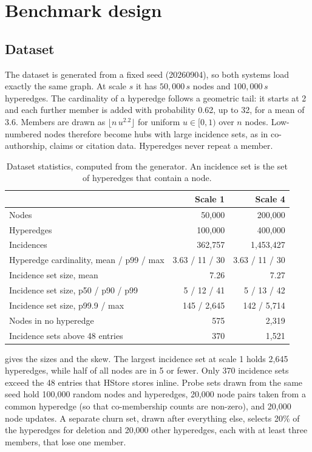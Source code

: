 \section{Benchmark design}
\label{sec:method}

\subsection{Dataset}

The dataset is generated from a fixed seed (20260904), so both systems load exactly the same graph. At scale $s$ it has $50{,}000\,s$ nodes and $100{,}000\,s$ hyperedges. The cardinality of a hyperedge follows a geometric tail: it starts at 2 and each further member is added with probability 0.62, up to 32, for a mean of 3.6. Members are drawn as $\lfloor n\,u^{2.2}\rfloor$ for uniform $u\in[0,1)$ over $n$ nodes. Low-numbered nodes therefore become hubs with large incidence sets, as in co-authorship, claims or citation data. Hyperedges never repeat a member.

\begin{table}[t]
\centering\footnotesize
\caption{Dataset statistics, computed from the generator. An incidence set is the set of hyperedges that contain a node.}
\label{tab:dataset}
\begin{tabular}{@{}lrr@{}}
\toprule
& Scale 1 & Scale 4 \\
\midrule
Nodes & 50{,}000 & 200{,}000 \\
Hyperedges & 100{,}000 & 400{,}000 \\
Incidences & 362{,}757 & 1{,}453{,}427 \\
\midrule
Hyperedge cardinality, mean / p99 / max & 3.63 / 11 / 30 & 3.63 / 11 / 30 \\
Incidence set size, mean & 7.26 & 7.27 \\
Incidence set size, p50 / p90 / p99 & 5 / 12 / 41 & 5 / 13 / 42 \\
Incidence set size, p99.9 / max & 145 / 2{,}645 & 142 / 5{,}714 \\
Nodes in no hyperedge & 575 & 2{,}319 \\
Incidence sets above 48 entries & 370 & 1{,}521 \\
\bottomrule
\end{tabular}
\end{table}

 gives the sizes and the skew. The largest incidence set at scale 1 holds 2,645 hyperedges, while half of all nodes are in 5 or fewer. Only 370 incidence sets exceed the 48 entries that HStore stores inline. Probe sets drawn from the same seed hold 100,000 random nodes and hyperedges, 20,000 node pairs taken from a common hyperedge (so that co-membership counts are non-zero), and 20,000 node updates. A separate churn set, drawn after everything else, selects 20\% of the hyperedges for deletion and 20,000 other hyperedges, each with at least three members, that lose one member.


